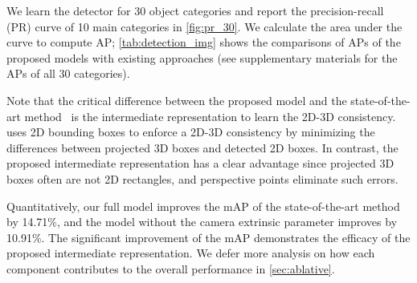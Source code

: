 \documentclass{article}
\begin{document}
We learn the detector for 30 object categories and report the precision-recall (PR) curve of 10 main categories in \autoref{fig:pr_30}. We calculate the area under the curve to compute AP; \autoref{tab:detection_img} shows the comparisons of APs of the proposed models with existing approaches (see supplementary materials for the APs of all 30 categories).


Note that the critical difference between the proposed model and the state-of-the-art method~\cite{huang2018cooperative} is the intermediate representation to learn the 2D-3D consistency. \citet{huang2018cooperative} uses 2D bounding boxes to enforce a 2D-3D consistency by minimizing the differences between projected 3D boxes and detected 2D boxes. In contrast, the proposed intermediate representation has a clear advantage since projected 3D boxes often are not 2D rectangles, and perspective points eliminate such errors.

Quantitatively, our full model improves the mAP of the state-of-the-art method~\cite{huang2018cooperative} by 14.71\%, and the model without the camera extrinsic parameter improves by 10.91\%. The significant improvement of the mAP demonstrates the efficacy of the proposed intermediate representation. We defer more analysis on how each component contributes to the overall performance in \autoref{sec:ablative}.

\begin{table}[b!]
    \caption{Comparisons of 3D object detection on SUN RGB-D (AP).}
    \setlength{\tabcolsep}{4pt}
    \centering
    \label{tab:detection_img}
\end{table}
\end{document}
